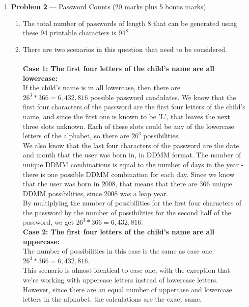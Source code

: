 \documentclass[11pt]{article}
\theoremstyle{definition}
\begin{document}
\begin{enumerate}
\begin{enumerate}
\item \emph {}
\end{enumerate}

\newpage

\item[] \textbf{Problem 2} --- Password Counts (20 marks plus 5 bonus marks)

\begin{enumerate}
\item The total number of passwords of length 8 that can be generated using these 94 printable characters is $94^8$

\item There are two scenarios in this question that need to be considered.\\
\\ \textbf{Case 1: The first four letters of the child's name are all lowercase:}\\
If the child's name is in all lowercase, then there are $26^3 * 366 = 6,432,816$ possible password candidates. We know that the first
four characters of the password are the first four letters of the child's name, and since the first one is known to be 'L', that leaves
the next three slots unknown. Each of these slots could be any of the lowercase letters of the alphabet, so there are $26^3$
possibilities.\\

We also know that the last four characters of the password are the date and month that the user was born in, in DDMM format. The number
of unique DDMM combinations is equal to the number of days in the year - there is one possible DDMM combination for each day. Since we know
that the user was born in 2008, that means that there are 366 unique DDMM possibilities, since 2008 was a leap year.\\

By multiplying the number of possibilities for the first four characters of the password by the number of possibilities for the second half of the password,
we get $26^3 * 366 = 6,432,816 $.\\

\textbf{Case 2: The first four letters of the child's name are all uppercase:}\\
The number of possibilities in this case is the same as case one: $26^3 * 366 = 6,432,816$.\\
This scenario is almost identical to case one, with the exception that we're working with uppercase letters instead of lowercase letters. However, since there
are an equal number of uppercase and lowercase letters in the alphabet, the calculations are the exact same.\\


\end{enumerate}
\end{enumerate}
\end{document}
